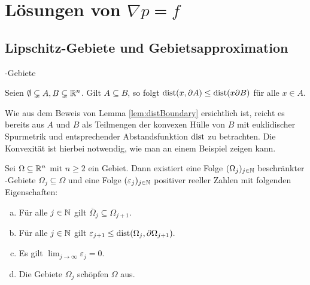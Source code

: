 \chapter{Lösungen von $\nabla p = f$}
\section{Lipschitz-Gebiete und Gebietsapproximation}

\begin{defn}
  \lipschitz\hyp{}Gebiete  
\end{defn}

\begin{lem}
  \label{lem:distBoundary}
  Seien $\emptyset \subsetneq A,B \subsetneq \mathbb{R}^n$. Gilt $A \subseteq B$, so folgt $\operatorname{dist}(x,\partial A) \leq \operatorname{dist}(x \partial B)$ für alle $x \in A$.
\end{lem}

\begin{bem}
  Wie aus dem Beweis von Lemma \ref{lem:distBoundary} ersichtlich ist, reicht es bereits aus $A$ und $B$ als Teilmengen der konvexen Hülle von $B$ mit euklidischer Spurmetrik und entsprechender Abstandsfunktion $\operatorname{dist}$ zu betrachten.
  Die Konvexität ist hierbei notwendig, wie man an einem Beispiel zeigen kann.
\end{bem}

\begin{lem}
  \label{lem:lipschitzExhaust}
  Sei $\Omega \subseteq \mathbb{R}^n$ mit $n \geq 2$ ein Gebiet.
  Dann existiert eine Folge $(\Omega_j)_{j \in \mathbb{N}}$ beschränkter \lipschitz\hyp{}Gebiete $\Omega_j \subseteq \Omega$ und eine Folge $(\varepsilon_j)_{j \in \mathbb{N}}$ positiver reeller Zahlen mit folgenden Eigenschaften:
  \begin{enumerate}[a)]
    \item Für alle $j \in \mathbb{N}$ gilt $\overline{\Omega}_j \subseteq \Omega_{j + 1}$.
    \item Für alle $j \in \mathbb{N}$ gilt $\varepsilon_{j + 1} \leq \operatorname{dist}(\Omega_j, \partial \Omega_{j + 1}).$
    \item Es gilt $\lim_{j \to \infty} \varepsilon_j = 0$.
    \item Die Gebiete $\Omega_j$ schöpfen $\Omega$ aus.
  \end{enumerate}
\end{lem}

